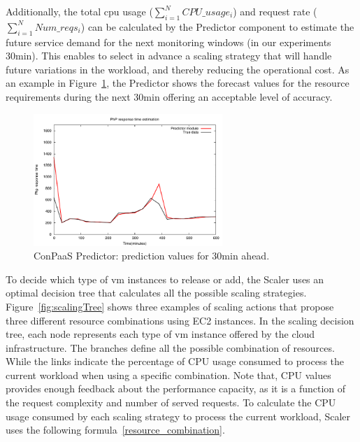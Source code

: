 Additionally, the total cpu usage ($\sum_{i=1}^N CPU\_usage_{i} $) and request rate ($\sum_{i=1}^N  Num\_reqs_{i}$) can be calculated by the Predictor component to estimate the future service demand for the next monitoring windows (in our experiments 30min). This enables to select in advance a scaling strategy that will handle future variations in the workload, and thereby reducing the operational cost. As an example in Figure~\ref{fig:forecast}, the Predictor shows the forecast values for the resource requirements during the next 30min offering an acceptable level of accuracy. 

\begin{figure}[htb]
  \begin{center}
    \includegraphics[height=5cm]{images/prediction_conpaas_30min}
  \end{center}
\vspace{-5mm}
  \caption{ConPaaS Predictor: prediction values for 30min ahead.}
  \label{fig:forecast}
\end{figure}


To decide which type of vm instances to release or add, the Scaler uses an optimal decision tree that calculates all the possible scaling strategies.  Figure~\ref{fig:scalingTree} shows three examples of scaling actions that propose three different resource combinations using EC2 instances. In the scaling decision tree, each node represents each type of vm instance offered by the cloud infrastructure. The branches define all the possible combination of resources. While the links indicate the percentage of CPU usage consumed to process the current workload when using a specific combination. Note that, CPU values provides enough feedback about the performance capacity, as it is a function of the request complexity  and number of served requests. To calculate the CPU usage consumed by each scaling strategy to process the current workload, Scaler uses the following formula~\ref{resource_combination}. 

